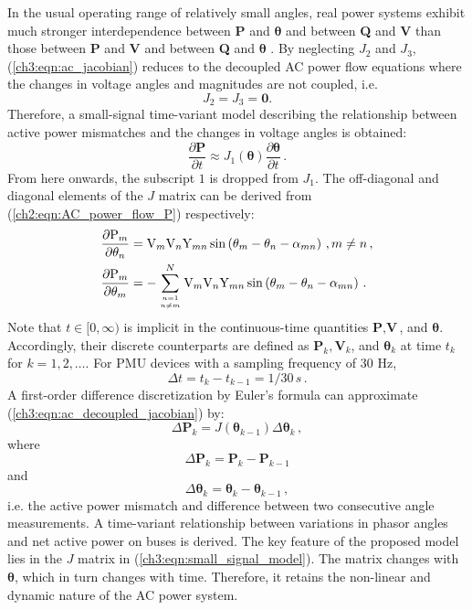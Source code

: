In the usual operating range of relatively small angles, real power systems exhibit much stronger interdependence between \textbf{P} and $\boldsymbol{\theta}$ and between \textbf{Q} and \textbf{V} than those between \textbf{P} and \textbf{V} and between \textbf{Q} and $\boldsymbol{\theta}$ \cite{murty2017power}. By neglecting ${J}_2$ and ${J}_3$, (\ref{ch3:eqn:ac_jacobian}) reduces to the decoupled AC power flow equations where the changes in voltage angles and magnitudes are not coupled, i.e. 
$$
{J}_2 = {J}_3 = \mathbf{0}.
$$
Therefore, a small-signal time-variant model describing the relationship between active power mismatches and the changes in voltage angles is obtained: 
\begin{equation}
\label{ch3:eqn:ac_decoupled_jacobian}
\frac{\partial \textbf{P}}{\partial t} \approx {J}_1(\boldsymbol{\theta}) \frac{\partial \boldsymbol{\theta}}{\partial t}\,.
\end{equation}
From here onwards, the subscript $1$ is dropped from ${J}_1$. The off-diagonal and diagonal elements of the ${J}$ matrix can be derived from (\ref{ch2:eqn:AC_power_flow_P}) respectively:
\begin{subequations}
\label{ch3:eqn:elements_J}
\begin{align}
    \frac{\partial \text{P}_{m}}{\partial \theta_{n}} 
    & = \text{V}_{m} \text{V}_{n} \text{Y}_{m n} \sin \left( \theta_{m} - \theta_{n} - \alpha_{m n} \right) \,,  m \neq n \,,\label{ch3:eqn:elements_J_off}\\ 
    \frac{\partial \text{P}_{m}}{\partial \theta_{m}} 
    & = -\sum_{ n=1 \atop n \neq m}^{N} \text{V}_{m} \text{V}_{n} \text{Y}_{m n} \sin \left( \theta_{m} - \theta_{n} - \alpha_{m n} \right) \,. \label{ch3:eqn:elements_J_diag} 
\end{align}
\end{subequations}
Note that $t \in [0, \infty)$ is implicit in the continuous-time quantities $\textbf{P}, \textbf{V}$, and $\boldsymbol{\theta}$. Accordingly, their discrete counterparts are defined as $\textbf{P}_k, \textbf{V}_k$, and $\boldsymbol{\theta}_k$ at time $t_k$ for $k = 1, 2, \dots$. For PMU devices with a sampling frequency of 30 Hz, 
$$
\Delta t = t_{k} - t_{k-1} = 1/30 \,s \,.
$$  
A first-order difference discretization by Euler's formula can approximate (\ref{ch3:eqn:ac_decoupled_jacobian}) by:
\begin{equation}
\label{ch3:eqn:small_signal_model}
    \Delta \textbf{P}_k =  {J}(\boldsymbol{\theta}_{k-1}) \Delta \boldsymbol{\theta}_k \,,
\end{equation}
where 
$$
\Delta \textbf{P}_k = \textbf{P}_k - \textbf{P}_{k-1}
$$
and 
$$
\Delta \boldsymbol{\theta}_k = \boldsymbol{\theta}_k - \boldsymbol{\theta}_{k-1} \,,
$$
i.e. the active power mismatch and difference between two consecutive angle measurements. A time-variant relationship between variations in phasor angles and net active power on buses is derived. 
The key feature of the proposed model lies in the ${J}$ matrix in (\ref{ch3:eqn:small_signal_model}). The matrix changes with $\boldsymbol{\theta}$, which in turn changes with time. Therefore, it retains the non-linear and dynamic nature of the AC power system.  

